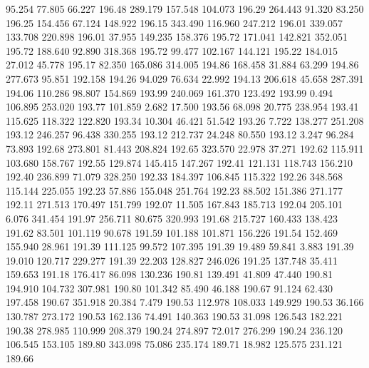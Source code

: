   95.254   77.805   66.227       196.48
 289.179  157.548  104.073       196.29
 264.443   91.320   83.250       196.25
 154.456   67.124  148.922       196.15
 343.490  116.960  247.212       196.01
 339.057  133.708  220.898       196.01
  37.955  149.235  158.376       195.72
 171.041  142.821  352.051       195.72
 188.640   92.890  318.368       195.72
  99.477  102.167  144.121       195.22
 184.015   27.012   45.778       195.17
  82.350  165.086  314.005       194.86
 168.458   31.884   63.299       194.86
 277.673   95.851  192.158       194.26
  94.029   76.634   22.992       194.13
 206.618   45.658  287.391       194.06
 110.286   98.807  154.869       193.99
 240.069  161.370  123.492       193.99
   0.494  106.895  253.020       193.77
 101.859    2.682   17.500       193.56
  68.098   20.775  238.954       193.41
 115.625  118.322  122.820       193.34
  10.304   46.421   51.542       193.26
   7.722  138.277  251.208       193.12
 246.257   96.438  330.255       193.12
 212.737   24.248   80.550       193.12
   3.247   96.284   73.893       192.68
 273.801   81.443  208.824       192.65
 323.570   22.978   37.271       192.62
 115.911  103.680  158.767       192.55
 129.874  145.415  147.267       192.41
 121.131  118.743  156.210       192.40
 236.899   71.079  328.250       192.33
 184.397  106.845  115.322       192.26
 348.568  115.144  225.055       192.23
  57.886  155.048  251.764       192.23
  88.502  151.386  271.177       192.11
 271.513  170.497  151.799       192.07
  11.505  167.843  185.713       192.04
 205.101    6.076  341.454       191.97
 256.711   80.675  320.993       191.68
 215.727  160.433  138.423       191.62
  83.501  101.119   90.678       191.59
 101.188  101.871  156.226       191.54
 152.469  155.940   28.961       191.39
 111.125   99.572  107.395       191.39
  19.489   59.841    3.883       191.39
  19.010  120.717  229.277       191.39
  22.203  128.827  246.026       191.25
 137.748   35.411  159.653       191.18
 176.417   86.098  130.236       190.81
 139.491   41.809   47.440       190.81
 194.910  104.732  307.981       190.80
 101.342   85.490   46.188       190.67
  91.124   62.430  197.458       190.67
 351.918   20.384    7.479       190.53
 112.978  108.033  149.929       190.53
  36.166  130.787  273.172       190.53
 162.136   74.491  140.363       190.53
  31.098  126.543  182.221       190.38
 278.985  110.999  208.379       190.24
 274.897   72.017  276.299       190.24
 236.120  106.545  153.105       189.80
 343.098   75.086  235.174       189.71
  18.982  125.575  231.121       189.66
